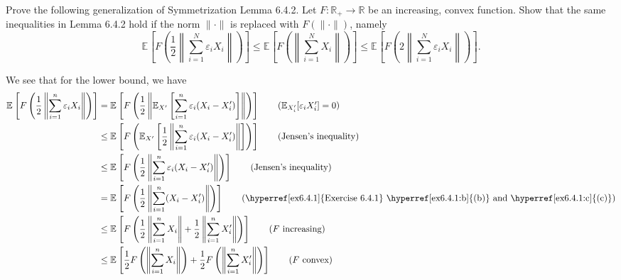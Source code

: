 \begin{problem*}[Exercise 6.4.5]\label{ex6.4.5}
	Prove the following generalization of Symmetrization Lemma 6.4.2. Let \(F \colon \mathbb{R} _+ \to \mathbb{R} \) be an increasing, convex function. Show that the same inequalities in Lemma 6.4.2 hold if the norm \(\lVert \cdot \rVert \) is replaced with \(F(\lVert \cdot \rVert )\), namely
	\[
		\mathbb{E}_{}\left[F \left( \frac{1}{2}\left\lVert \sum_{i=1}^{N} \varepsilon _i X_i \right\rVert \right) \right]
		\leq \mathbb{E}_{}\left[F \left( \left\lVert \sum_{i=1}^{N} X_i \right\rVert \right) \right]
		\leq \mathbb{E}_{}\left[F \left( 2 \left\lVert \sum_{i=1}^{N} \varepsilon _i X_i \right\rVert \right) \right] .
	\]
\end{problem*}
\begin{answer}
	We see that for the lower bound, we have
	\begin{align*}
		\mathbb{E}_{}\left[F \left( \frac{1}{2} \left\lVert \sum_{i=1}^{n} \varepsilon _i X_i \right\rVert  \right) \right]
		 & = \mathbb{E}_{}\left[F \left( \frac{1}{2} \left\lVert \mathbb{E}_{X^{\prime} }\left[\sum_{i=1}^{n} \varepsilon _i (X_i - X_i^{\prime} ) \right] \right\rVert \right) \right] \tag*{(\(\mathbb{E}_{X^{\prime}_i }[\varepsilon _i X_i^{\prime} ] = 0 \))} \\
		 & \leq \mathbb{E}_{}\left[F \left( \mathbb{E}_{X^{\prime} }\left[ \frac{1}{2} \left\lVert \sum_{i=1}^{n} \varepsilon _i (X_i - X_i^{\prime} ) \right\rVert \right] \right) \right] \tag*{(Jensen's inequality)}                                           \\
		 & \leq \mathbb{E}_{}\left[F \left( \frac{1}{2} \left\lVert \sum_{i=1}^{n} \varepsilon _i (X_i - X_i^{\prime} ) \right\rVert \right) \right] \tag*{(Jensen's inequality)}                                                                                  \\
		 & = \mathbb{E}_{}\left[F \left( \frac{1}{2} \left\lVert \sum_{i=1}^{n} (X_i - X_i^{\prime} ) \right\rVert \right) \right] \tag*{(\hyperref[ex6.4.1]{Exercise 6.4.1} \hyperref[ex6.4.1:b]{(b)} and \hyperref[ex6.4.1:c]{(c)})}                             \\
		 & \leq \mathbb{E}_{}\left[F \left( \frac{1}{2} \left\lVert \sum_{i=1}^{n} X_i \right\rVert + \frac{1}{2} \left\lVert \sum_{i=1}^{n} X_i^{\prime} \right\rVert \right) \right] \tag*{(\(F\) increasing)}                                                   \\
		 & \leq \mathbb{E}_{}\left[\frac{1}{2} F \left( \left\lVert \sum_{i=1}^{n} X_i \right\rVert \right) +  \frac{1}{2} F \left( \left\lVert \sum_{i=1}^{n} X_i^{\prime} \right\rVert \right) \right] \tag*{(\(F\) convex)}                                     \\

\end{align*}
\end{answer}
